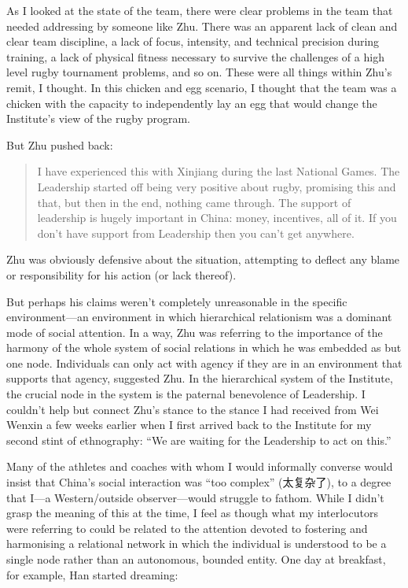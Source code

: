   As I looked at the state of the team, there were clear problems in the team that needed addressing by someone like Zhu.  There was an apparent lack of clean and clear team discipline, a lack of focus, intensity, and technical precision during training, a lack of physical fitness necessary to survive the challenges of a high level rugby tournament problems, and so on.  These were all things within Zhu's remit, I thought.  In this chicken and egg scenario, I thought that the team was a chicken with the capacity to independently lay an egg that would change the Institute's view of the rugby program.

  But Zhu pushed back:

  \begin{quotation}
    I have experienced this with Xinjiang during the last National Games. The Leadership started off being very positive about rugby, promising this and that, but then in the end, nothing came through.  The support of leadership is hugely important in China: money, incentives, all of it.  If you don't have support from Leadership then you can't get anywhere.
  \end{quotation}

  Zhu was obviously defensive about the situation, attempting to deflect any blame or responsibility for his action (or lack thereof).

  But perhaps his claims weren't completely unreasonable in the specific environment---an environment in which hierarchical relationism was a dominant mode of social attention.  In a way, Zhu was referring to the importance of the harmony of the whole system of social relations in which he was embedded as but one node. Individuals can only act with agency if they are in an environment that supports that agency, suggested Zhu. In the hierarchical system of the Institute, the crucial node in the system is the paternal benevolence of Leadership.  I couldn't help but connect Zhu's stance to the stance I had received from Wei Wenxin a few weeks earlier when I first arrived back to the Institute for my second stint of ethnography: ``We are waiting for the Leadership to act on this.''

  Many of the athletes and coaches with whom I would informally converse would insist that China's social interaction was ``too complex'' (太复杂了), to a degree that I---a Western/outside observer---would struggle to fathom.  While I didn't grasp the meaning of this at the time, I feel as though what my interlocutors were referring to could be related to the attention devoted to fostering and harmonising a relational network in which the individual is understood to be a single node rather than an autonomous, bounded entity. One day at breakfast, for example, Han started dreaming:

